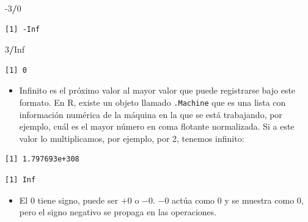 \documentclass[openany]{book}
\newenvironment{Shaded}{\begin{snugshade}}{\end{snugshade}}
\newcommand{\DecValTok}[1]{\textcolor[rgb]{0.00,0.00,0.81}{#1}}
\newcommand{\NormalTok}[1]{#1}
\newcommand{\OperatorTok}[1]{\textcolor[rgb]{0.81,0.36,0.00}{\textbf{#1}}}
\newcommand{\OtherTok}[1]{\textcolor[rgb]{0.56,0.35,0.01}{#1}}
\newcommand{\StringTok}[1]{\textcolor[rgb]{0.31,0.60,0.02}{#1}}
\providecommand{\tightlist}{%
  \setlength{\itemsep}{0pt}\setlength{\parskip}{0pt}}
\begin{document}
\begin{Shaded}
\begin{Highlighting}[]
\DecValTok{-3}\OperatorTok{/}\DecValTok{0}
\end{Highlighting}
\end{Shaded}

\begin{verbatim}
[1] -Inf
\end{verbatim}

\begin{Shaded}
\begin{Highlighting}[]
\DecValTok{3}\OperatorTok{/}\OtherTok{Inf}
\end{Highlighting}
\end{Shaded}

\begin{verbatim}
[1] 0
\end{verbatim}

\begin{itemize}
\tightlist
\item
  Infinito es el próximo valor al mayor valor que puede registrarse bajo este formato. En R, existe un objeto llamado \texttt{.Machine} que es una lista con información numérica de la máquina en la que se está trabajando, por ejemplo, cuál es el mayor número en coma flotante normalizada. Si a este valor lo multiplicamos, por ejemplo, por 2, tenemos infinito:
\end{itemize}

\begin{Shaded}
\end{Shaded}

\begin{verbatim}
[1] 1.797693e+308
\end{verbatim}

\begin{Shaded}
\end{Shaded}

\begin{verbatim}
[1] Inf
\end{verbatim}

\begin{itemize}
\tightlist
\item
  El 0 tiene signo, puede ser \(+0\) o \(-0\). \(-0\) actúa como \(0\) y se muestra como \(0\), pero el signo negativo se propaga en las operaciones.
\end{itemize}
\end{document}
